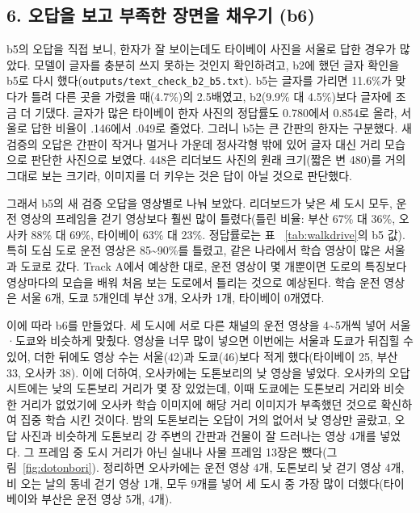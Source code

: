 \documentclass[11pt]{article}
\begin{document}
\subsection*{6. 오답을 보고 부족한 장면을 채우기 (b6)}

b5의 오답을 직접 보니, 한자가 잘 보이는데도 타이베이 사진을 서울로 답한 경우가 많았다. 모델이 글자를 충분히 쓰지 못하는 것인지 확인하려고, b2에 했던 글자 확인을 b5로 다시 했다(\texttt{outputs/text\_check\_b2\_b5.txt}). b5는 글자를 가리면 11.6\%가 맞다가 틀려 다른 곳을 가렸을 때(4.7\%)의 2.5배였고, b2(9.9\% 대 4.5\%)보다 글자에 조금 더 기댔다. 글자가 많은 타이베이 한자 사진의 정답률도 0.780에서 0.854로 올라, 서울로 답한 비율이 .146에서 .049로 줄었다. 그러니 b5는 큰 간판의 한자는 구분했다. 새 검증의 오답은 간판이 작거나 멀거나 가운데 정사각형 밖에 있어 글자 대신 거리 모습으로 판단한 사진으로 보였다. 448은 리더보드 사진의 원래 크기(짧은 변 480)를 거의 그대로 보는 크기라, 이미지를 더 키우는 것은 답이 아닐 것으로 판단했다.

그래서 b5의 새 검증 오답을 영상별로 나눠 보았다. 리더보드가 낮은 세 도시 모두, 운전 영상의 프레임을 걷기 영상보다 훨씬 많이 틀렸다(틀린 비율: 부산 67\% 대 36\%, 오사카 88\% 대 69\%, 타이베이 63\% 대 23\%. 정답률로는 표~
\ref{tab:walkdrive}의 b5 값). 특히 도심 도로 운전 영상은 85\textasciitilde 90\%를 틀렸고, 같은 나라에서 학습 영상이 많은 서울과 도쿄로 갔다. Track A에서 예상한 대로, 운전 영상이 몇 개뿐이면 도로의 특징보다 영상마다의 모습을 배워 처음 보는 도로에서 틀리는 것으로 예상된다. 학습 운전 영상은 서울 6개, 도쿄 5개인데 부산 3개, 오사카 1개, 타이베이 0개였다.

이에 따라 b6를 만들었다. 세 도시에 서로 다른 채널의 운전 영상을 4\textasciitilde 5개씩 넣어 서울·도쿄와 비슷하게 맞췄다. 영상을 너무 많이 넣으면 이번에는 서울과 도쿄가 뒤집힐 수 있어, 더한 뒤에도 영상 수는 서울(42)과 도쿄(46)보다 적게 했다(타이베이 25, 부산 33, 오사카 38). 이에 더하여, 오사카에는 도톤보리의 낮 영상을 넣었다. 오사카의 오답 시트에는 낮의 도톤보리 거리가 몇 장 있었는데, 이때 도쿄에는 도톤보리 거리와 비슷한 거리가 없었기에 오사카 학습 이미지에 해당 거리 이미지가 부족했던 것으로 확신하여 집중 학습 시킨 것이다. 밤의 도톤보리는 오답이 거의 없어서 낮 영상만 골랐고, 오답 사진과 비슷하게 도톤보리 강 주변의 간판과 건물이 잘 드러나는 영상 4개를 넣었다. 그 프레임 중 도시 거리가 아닌 실내나 사물 프레임 13장은 뺐다(그림~\ref{fig:dotonbori}). 정리하면 오사카에는 운전 영상 4개, 도톤보리 낮 걷기 영상 4개, 비 오는 날의 동네 걷기 영상 1개, 모두 9개를 넣어 세 도시 중 가장 많이 더했다(타이베이와 부산은 운전 영상 5개, 4개). 
\end{document}
